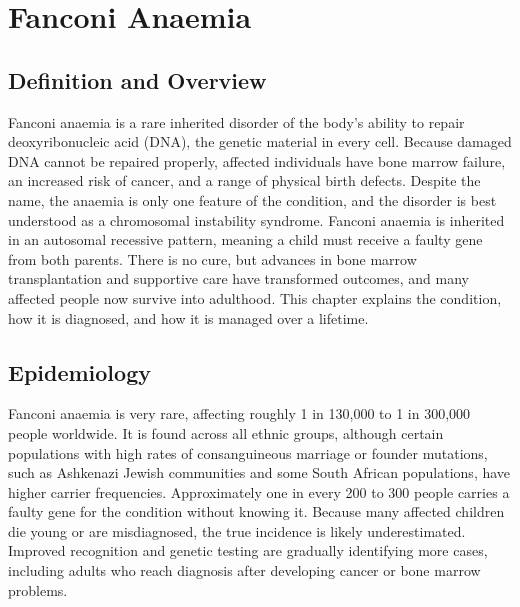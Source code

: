 \chapter{Fanconi Anaemia}

\section*{Definition and Overview}
Fanconi anaemia is a rare inherited disorder of the body's ability to repair deoxyribonucleic acid (DNA), the genetic material in every cell. Because damaged DNA cannot be repaired properly, affected individuals have bone marrow failure, an increased risk of cancer, and a range of physical birth defects. Despite the name, the anaemia is only one feature of the condition, and the disorder is best understood as a chromosomal instability syndrome. Fanconi anaemia is inherited in an autosomal recessive pattern, meaning a child must receive a faulty gene from both parents. There is no cure, but advances in bone marrow transplantation and supportive care have transformed outcomes, and many affected people now survive into adulthood. This chapter explains the condition, how it is diagnosed, and how it is managed over a lifetime.

\section*{Epidemiology}
Fanconi anaemia is very rare, affecting roughly 1 in 130,000 to 1 in 300,000 people worldwide. It is found across all ethnic groups, although certain populations with high rates of consanguineous marriage or founder mutations, such as Ashkenazi Jewish communities and some South African populations, have higher carrier frequencies. Approximately one in every 200 to 300 people carries a faulty gene for the condition without knowing it. Because many affected children die young or are misdiagnosed, the true incidence is likely underestimated. Improved recognition and genetic testing are gradually identifying more cases, including adults who reach diagnosis after developing cancer or bone marrow problems.

